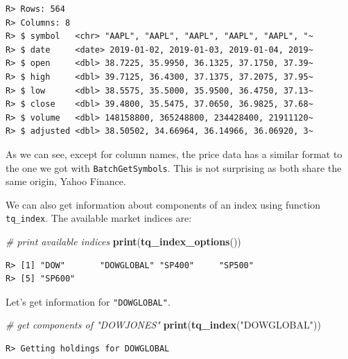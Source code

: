 \documentclass[
  12pt,
]{book}
\newenvironment{Shaded}{\begin{snugshade}}{\end{snugshade}}
\newcommand{\CommentTok}[1]{\textcolor[rgb]{0.37,0.37,0.37}{\textit{#1}}}
\newcommand{\KeywordTok}[1]{\textcolor[rgb]{0.27,0.27,0.27}{\textbf{#1}}}
\newcommand{\NormalTok}[1]{#1}
\newcommand{\StringTok}[1]{\textcolor[rgb]{0.5,0.5,0.5}{#1}}
\begin{document}
\begin{verbatim}
R> Rows: 564
R> Columns: 8
R> $ symbol   <chr> "AAPL", "AAPL", "AAPL", "AAPL", "AAPL", "~
R> $ date     <date> 2019-01-02, 2019-01-03, 2019-01-04, 2019~
R> $ open     <dbl> 38.7225, 35.9950, 36.1325, 37.1750, 37.39~
R> $ high     <dbl> 39.7125, 36.4300, 37.1375, 37.2075, 37.95~
R> $ low      <dbl> 38.5575, 35.5000, 35.9500, 36.4750, 37.13~
R> $ close    <dbl> 39.4800, 35.5475, 37.0650, 36.9825, 37.68~
R> $ volume   <dbl> 148158800, 365248800, 234428400, 21911120~
R> $ adjusted <dbl> 38.50502, 34.66964, 36.14966, 36.06920, 3~
\end{verbatim}

As we can see, except for column names, the price data has a similar format to the one we got with \texttt{BatchGetSymbols}. This is not surprising as both share the same origin, Yahoo Finance.

We can also get information about components of an index using function \texttt{tq\_index}. The available market indices are:  

\begin{Shaded}
\begin{Highlighting}[]
\CommentTok{# print available indices}
\KeywordTok{print}\NormalTok{(}\KeywordTok{tq_index_options}\NormalTok{())}
\end{Highlighting}
\end{Shaded}

\begin{verbatim}
R> [1] "DOW"       "DOWGLOBAL" "SP400"     "SP500"    
R> [5] "SP600"
\end{verbatim}

Let's get information for \texttt{"DOWGLOBAL"}.

\begin{Shaded}
\begin{Highlighting}[]
\CommentTok{# get components of "DOWJONES"}
\KeywordTok{print}\NormalTok{(}\KeywordTok{tq_index}\NormalTok{(}\StringTok{"DOWGLOBAL"}\NormalTok{))}
\end{Highlighting}
\end{Shaded}

\begin{verbatim}
R> Getting holdings for DOWGLOBAL
\end{verbatim}
\end{document}
